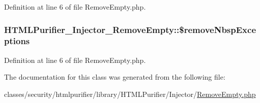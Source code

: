 Definition at line 6 of file Remove\+Empty.\+php.

\hypertarget{classHTMLPurifier__Injector__RemoveEmpty_a13fb5587daceb1290725075c52981012}{
\subsubsection[{\$remove\+Nbsp\+Exceptions}]{\setlength{\rightskip}{0pt plus 5cm}H\+T\+M\+L\+Purifier\+\_\+\+Injector\+\_\+\+Remove\+Empty\+::\$remove\+Nbsp\+Exceptions}}\label{classHTMLPurifier__Injector__RemoveEmpty_a13fb5587daceb1290725075c52981012}


Definition at line 6 of file Remove\+Empty.\+php.



The documentation for this class was generated from the following file\+:\begin{DoxyCompactItemize}
\item 
classes/security/htmlpurifier/library/\+H\+T\+M\+L\+Purifier/\+Injector/\hyperlink{RemoveEmpty_8php}{Remove\+Empty.\+php}\end{DoxyCompactItemize}
